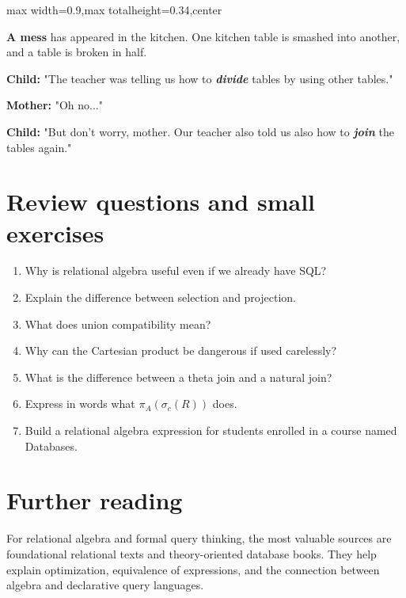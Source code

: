 \documentclass[11pt,a4paper,openany]{book}
\newcommand{\RAselect}{\sigma}
\newcommand{\RAproject}{\pi}
\begin{document}
\begin{jokebox}
\begin{adjustbox}{max width=0.9\linewidth,max totalheight=0.34\textheight,center}
\end{adjustbox}

\medskip
\textbf{A mess} has appeared in the kitchen. One kitchen table is smashed
into another, and a table is broken in half.

\textbf{Child:} "The teacher was telling us how to \textbf{\textit{divide}} tables by using other tables."

\textbf{Mother:} "Oh no..."

\textbf{Child:} "But don't worry, mother. Our teacher also told us also how to \textbf{\textit{join}} the tables again."
\end{jokebox}


\section{Review questions and small exercises}
\begin{enumerate}
\item Why is relational algebra useful even if we already have SQL?
\item Explain the difference between selection and projection.
\item What does union compatibility mean?
\item Why can the Cartesian product be dangerous if used carelessly?
\item What is the difference between a theta join and a natural join?
\item Express in words what \(\RAproject_{A}(\RAselect_c(R))\) does.
\item Build a relational algebra expression for students enrolled in a course named Databases.
\end{enumerate}

\section{Further reading}
For relational algebra and formal query thinking, the most valuable sources are foundational relational texts and theory-oriented database books. They help explain optimization, equivalence of expressions, and the connection between algebra and declarative query languages.
\end{document}
